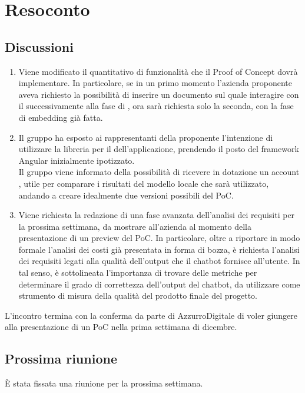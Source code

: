\section{Resoconto} \label{sec:resoconto}
\subsection{Discussioni} \label{subsec:resdiscussione}
\begin{enumerate}
    \item Viene modificato il quantitativo di funzionalità che il Proof of Concept dovrà implementare. In particolare, se in un primo momento l'azienda proponente aveva richiesto la possibilità di inserire un documento sul quale interagire con il  successivamente alla fase di , ora sarà richiesta solo la seconda, con la fase di embedding già fatta.
    \item Il gruppo ha esposto ai rappresentanti della proponente l'intenzione di utilizzare la libreria  per il  dell'applicazione, prendendo il posto del framework Angular inizialmente ipotizzato.\\
    Il gruppo viene informato della possibilità di ricevere in dotazione un account , utile per comparare i risultati del modello locale  che sarà utilizzato, andando a creare idealmente due versioni possibili del PoC.
    \item Viene richiesta la redazione di una fase avanzata dell'analisi dei requisiti per la prossima settimana, da mostrare all'azienda al momento della presentazione di un preview del PoC. In particolare, oltre a riportare in modo formale l'analisi dei costi già presentata in forma di bozza, è richiesta l'analisi dei requisiti legati alla qualità dell'output che il chatbot fornisce all'utente. In tal senso, è sottolineata l'importanza di trovare delle metriche per determinare il grado di correttezza dell'output del chatbot, da utilizzare come strumento di misura della qualità del prodotto finale del progetto.
\end{enumerate}
L'incontro termina con la conferma da parte di AzzurroDigitale di voler giungere alla presentazione di un PoC nella prima settimana di dicembre.

\subsection{Prossima riunione} \label{subsec:riunione}
È stata fissata una riunione per la prossima settimana.
